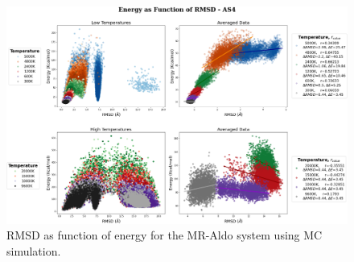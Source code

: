 \documentclass[
  journal=usp, %
  manuscript=final-report,
  year=2023,
  volume=1,
]{cup-journal}
\begin{document}
{\vspace{80pt}

\begin{figure}
\vspace{-60pt}
\centering
\includegraphics[width=0.9\linewidth]{Images/MC_energies.png}
\caption{RMSD as function of energy for the MR-Aldo system using MC simulation.}
\label{MC_RMSD_energy}
\end{figure}


\begin{figure}[hbt!]


\end{figure}}
\end{document}
